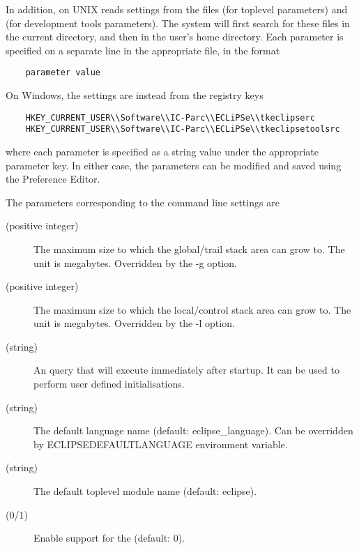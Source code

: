 In addition,  on UNIX reads settings from 
the files  (for toplevel parameters) and
 (for development tools parameters).
The system will first search for these files in the current directory,
and then in the user's home directory.
Each parameter is specified on a separate line in the appropriate
file, in the format
\begin{verbatim}
    parameter value
\end{verbatim}
On Windows, the settings are instead from the registry keys
\begin{verbatim}
    HKEY_CURRENT_USER\\Software\\IC-Parc\\ECLiPSe\\tkeclipserc
    HKEY_CURRENT_USER\\Software\\IC-Parc\\ECLiPSe\\tkeclipsetoolsrc
\end{verbatim}
where each parameter is specified as a string value under the appropriate
parameter key.
In either case, the parameters can be modified and saved using the
{\tkeclipse} Preference Editor.

The parameters corresponding to the {\eclipse} command line settings are
\begin{description}
\item[ (positive integer)]
    The maximum size to which the
    global/trail stack area can grow
    to. The unit is megabytes. 
    Overridden by the -g option.
\item[ (positive integer)]
    The maximum size to which the
    local/control stack area can grow
    to. The unit is megabytes.
    Overridden by the -l option.
\item[ (string)]
    An {\eclipse} query that {\tkeclipse}
    will execute immediately after
    startup. It can be used to perform
    user defined initialisations.
\item[ (string)]
    The default language name (default: eclipse_language).
    Can be overridden by ECLIPSEDEFAULTLANGUAGE environment variable.
\item[ (string)]
    The default toplevel module name (default: eclipse).
\item[ (0/1)]
    Enable support for the 
    (default: 0).
\end{description}

